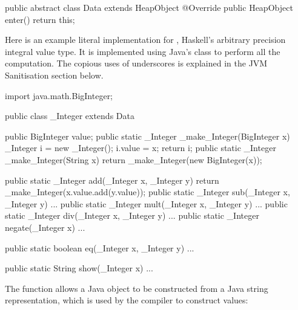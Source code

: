 \documentclass[dissertation.tex]{subfiles}
\begin{document}
{{{{                \begin{javafigure}
                public abstract class Data extends HeapObject {
                    @Override
                    public HeapObject enter() {
                        return this;
                    }
                }
                \end{javafigure}

                Here is an example literal implementation for , Haskell's arbitrary precision integral
                value type. It is implemented using Java's  class to perform all the computation. The
                copious uses of underscores is explained in the JVM Sanitisation section below.

                \begin{javafigure}
                import java.math.BigInteger;

                public class _Integer extends Data {
                    public BigInteger value;
                    public static _Integer _make_Integer(BigInteger x) {
                        _Integer i = new _Integer();
                        i.value = x;
                        return i;
                    }
                    public static _Integer _make_Integer(String x) {
                        return _make_Integer(new BigInteger(x));
                    }

                    public static _Integer add(_Integer x, _Integer y) {
                        return _make_Integer(x.value.add(y.value));
                    }
                    public static _Integer sub(_Integer x, _Integer y) { ... }
                    public static _Integer mult(_Integer x, _Integer y) { ... }
                    public static _Integer div(_Integer x, _Integer y) { ... }
                    public static _Integer negate(_Integer x) { ... }

                    public static boolean eq(_Integer x, _Integer y) { ... }

                    public static String show(_Integer x) { ... }
                }
                \end{javafigure}

                The  function allows a Java  object to be constructed from a
                Java string representation, which is used by the compiler to construct  values:


}}}}
\end{document}
